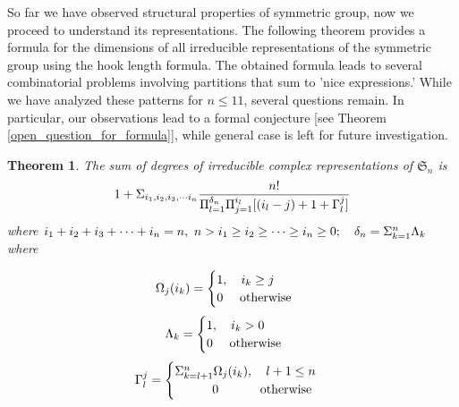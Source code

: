 \documentclass[oneside]{amsart}
\theoremstyle{plain}
\newtheorem{theorem}{Theorem}[section] %
\theoremstyle{definition}
\theoremstyle{remark}
\begin{document}
    So far we have observed structural properties of symmetric group, now we proceed to understand its representations. The following theorem provides a formula for the dimensions of all irreducible representations of the symmetric group using the hook length formula. The obtained formula leads to several combinatorial problems involving partitions that sum to 'nice expressions.' While we have analyzed these patterns for $n \leq 11$, several questions remain. In particular, our observations lead to a formal conjecture [see Theorem \ref{open_question_for_formula}], while general case is left for future investigation.
     \begin{theorem}\label{sodoicrs}
        The sum of degrees of irreducible complex representations of $\mathfrak{S}_n$ is
        \begin{align*}
            1 + \Sigma_{i_1, i_2, i_3, \cdots i_n}\frac{n!}{\Pi_{l = 1}^{{\delta}_n}\Pi_{j = 1}^{i_{l}} [(i_l - j) + 1 + {\Large\Gamma}_l^j]}
        \end{align*} where $i_1 + i_2 + i_3 + \cdots + i_n = n,\ n > i_1 \geq i_2 \geq \cdots \geq i_n \geq 0; \quad {\Large\delta}_n = \Sigma_{k = 1}^{n}{\Large\Lambda}_k$ where
        
        \begin{align*}
            {\Large\Omega}_j(i_k) = \begin{cases}
                    1, \quad i_k \geq j\\
                        0 \quad \text{ otherwise }
            \end{cases}
        \end{align*}
        \begin{align*}
            {\Large\Lambda}_k = \begin{cases}
                    1,  \quad i_k > 0\\
                        0  \quad \text{ otherwise }
            \end{cases}
        \end{align*} 
        \begin{align*}
            {\Large\Gamma}_l^j = \begin{cases}
                    \Sigma_{k = l + 1}^{n}{\Large\Omega}_j(i_k),  \quad  l + 1 \leq n\\
                        \quad \quad \quad 0  \quad\qquad \text{ otherwise }
            \end{cases}
        \end{align*}
    \end{theorem}
\end{document}

